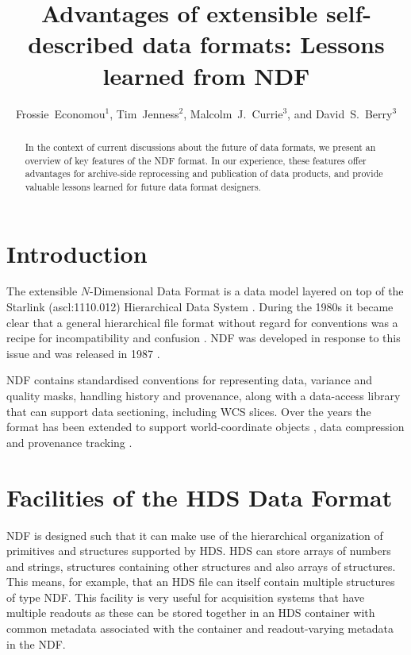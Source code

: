 \documentclass[11pt,twoside]{article}
\begin{document}
\title{Advantages of extensible self-described data formats: Lessons learned from NDF}
\author{Frossie~Economou$^1$, Tim~Jenness$^2$, Malcolm~J.~Currie$^3$,
and David~S.~Berry$^3$
}

\begin{abstract}
  In the context of current discussions about the future of data
  formats, we present an overview of key features of the NDF
  format. In our experience, these features offer advantages for
  archive-side reprocessing and publication of data products, and
  provide valuable lessons learned for future data format designers.
\end{abstract}

\section{Introduction}

The extensible $N$-Dimensional Data Format
\citep[NDF;][]{1993ASPC...52..229W,SGP38} is a data model layered on
top of the Starlink (ascl:1110.012) Hierarchical Data System
\citep[HDS;][]{1982QJRAS..23..485D}. During the 1980s it became clear
that a general hierarchical file format without regard for conventions
was a recipe for incompatibility and confusion \citep[see
e.g.][]{1993ASPC...52..219S}. NDF was developed in response to this
issue and was released in 1987 \citep[see
e.g.][]{1988STARB...2...11C}.

NDF contains standardised conventions for representing data,
variance and quality masks, handling history and provenance, along
with a data-access library that can support data sectioning, including
WCS slices. Over the years the format has been extended to support
world-coordinate objects \citep{2001ASPC..238..129B}, data compression
\citep{2008ASPC..394..650C} and provenance tracking
\citep{2009ASPC..411..418J}.

\section{Facilities of the HDS Data Format}

NDF is designed such that it can make use of the hierarchical
organization of primitives and structures supported by HDS. HDS can
store arrays of numbers and strings, structures containing other
structures and also arrays of structures. This means, for example,
that an HDS file can itself contain multiple structures of type
NDF. This facility is very useful for acquisition systems that have
multiple readouts as these can be stored together in an HDS container
with common metadata associated with the container and readout-varying
metadata in the NDF.
\end{document}
